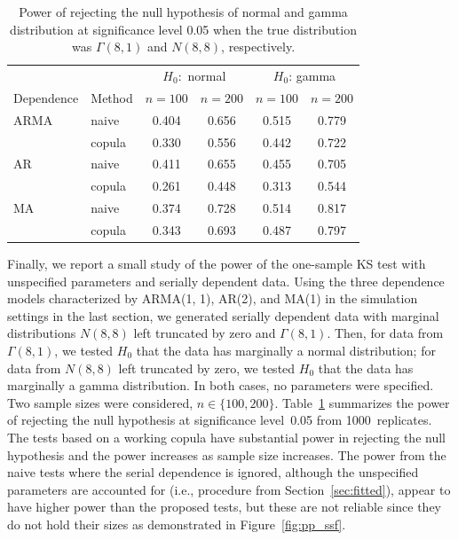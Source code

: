 \documentclass[12pt, letterpaper]{article}
\begin{document}
\begin{table}[tbp]
  \label{tab:power}
  \caption{Power of rejecting the null hypothesis of normal and gamma
    distribution at significance level 0.05 when the true distribution was
    $\Gamma(8, 1)$ and $N(8, 8)$, respectively. }
\centering
\begin{tabular}{ll cccc}
  \toprule
  &  & \multicolumn{2}{c}{$H_0:$ normal} &
  \multicolumn{2}{c}{$H_0$: gamma}\\
  \cmidrule(lr){3-4}\cmidrule(lr){5-6}
  Dependence & Method & $n = 100$ & $n = 200$ & $n = 100$ & $n = 200$\\
  \midrule
ARMA & naive & 0.404 & 0.656 & 0.515 & 0.779 \\ 
 & copula & 0.330 & 0.556 & 0.442 & 0.722 \\ 
AR & naive & 0.411 & 0.655 & 0.455 & 0.705 \\ 
& copula & 0.261 & 0.448 & 0.313 & 0.544 \\ 
MA & naive & 0.374 & 0.728 & 0.514 & 0.817 \\ 
& copula & 0.343 & 0.693 & 0.487 & 0.797 \\ 
   \bottomrule
\end{tabular}
\end{table}

Finally, we report a small study of the power of the one-sample KS test with
unspecified parameters and serially dependent data. Using the three dependence
models characterized by ARMA(1, 1), AR(2), and MA(1) in the simulation settings
in the last section, we generated serially
dependent data with marginal distributions $N(8, 8)$ left truncated by zero and
$\Gamma(8, 1)$. 
Then, for data from $\Gamma(8, 1)$, we tested $H_0$ that the
data has marginally a normal distribution; for data from $N(8, 8)$ left
truncated by zero, we tested $H_0$ that the data has marginally a gamma
distribution.  In both cases, no parameters were specified. Two sample sizes
were considered, $n \in \{100, 200\}$. Table~\ref{tab:power} summarizes the
power of rejecting the null hypothesis at significance level~0.05 from
1000~replicates. The tests
based on a working copula have substantial power in rejecting the null
hypothesis and the power increases as sample size increases. The power from the
naive tests where the serial dependence is ignored, although the unspecified
parameters are accounted for (i.e., procedure from 
Section~\ref{sec:fitted}), appear to 
have higher power than the proposed tests, but these are not reliable since they 
do not hold their sizes as demonstrated in Figure~\ref{fig:pp_ssf}.
\end{document}
